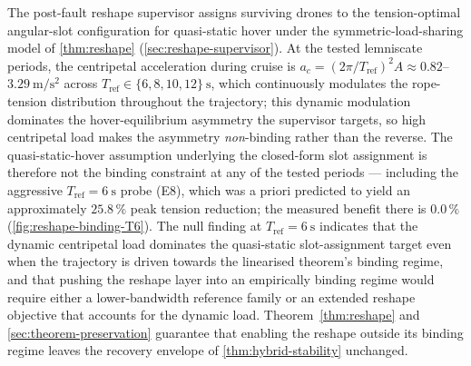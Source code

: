 \begin{remark}
\label{rem:reshape-null}
  The post-fault reshape supervisor assigns surviving drones to the tension-optimal angular-slot configuration for quasi-static hover under the symmetric-load-sharing model of \cref{thm:reshape} (\cref{sec:reshape-supervisor}). At the tested lemniscate periods, the centripetal acceleration during cruise is $a_c = (2\pi/T_{\mathrm{ref}})^2 A \approx 0.82$--$3.29~\si{\metre\per\square\second}$ across $T_{\mathrm{ref}} \in \{6,8,10,12\}~\si{\second}$, which continuously modulates the rope-tension distribution throughout the trajectory; this dynamic modulation dominates the hover-equilibrium asymmetry the supervisor targets, so high centripetal load makes the asymmetry \emph{non}-binding rather than the reverse. The quasi-static-hover assumption underlying the closed-form slot assignment is therefore not the binding constraint at any of the tested periods --- including the aggressive $T_{\mathrm{ref}}=\SI{6}{\second}$ probe (E8), which was a priori predicted to yield an approximately $25.8\,\%$ peak tension reduction; the measured benefit there is $0.0\,\%$ (\cref{fig:reshape-binding-T6}). The null finding at $T_{\mathrm{ref}}=\SI{6}{\second}$ indicates that the dynamic centripetal load dominates the quasi-static slot-assignment target even when the trajectory is driven towards the linearised theorem's binding regime, and that pushing the reshape layer into an empirically binding regime would require either a lower-bandwidth reference family or an extended reshape objective that accounts for the dynamic load. Theorem~\ref{thm:reshape} and \cref{sec:theorem-preservation} guarantee that enabling the reshape outside its binding regime leaves the recovery envelope of \cref{thm:hybrid-stability} unchanged.
\end{remark}

